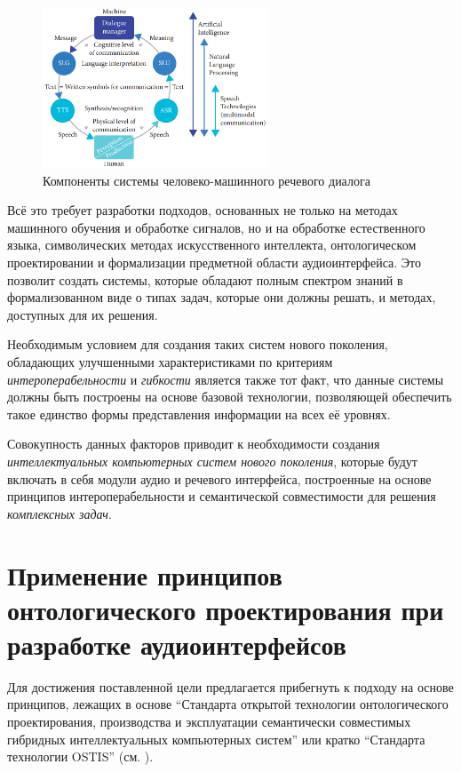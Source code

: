 \begin{figure}[H]
    \centerline{
        \includegraphics[scale=0.6, width=0.6\textwidth]{author/part4/figures/ch43_fig01_speech-hmi-components.png}
    }
    \caption{Компоненты системы человеко-машинного речевого диалога \cite{Delic2019speech}}
    \label{fig:speech-hmi-components}
\end{figure}

Всё это требует разработки подходов, основанных не только на методах машинного обучения и обработке сигналов, но и на обработке естественного языка, символических методах искусственного интеллекта, онтологическом проектировании и формализации предметной области аудиоинтерфейса. Это позволит создать системы, которые обладают полным спектром знаний в формализованном виде о типах задач, которые они должны решать, и методах, доступных для их решения.

Необходимым условием для создания таких систем нового поколения, обладающих улучшенными характеристиками по критериям \textit{интероперабельности} и \textit{гибкости} является также тот факт, что данные системы должны быть построены на основе базовой технологии, позволяющей обеспечить такое единство формы представления информации на всех её уровнях.
 
Совокупность данных факторов приводит к необходимости создания \textit{интеллектуальных компьютерных систем нового поколения}, которые будут включать в себя модули аудио и речевого интерфейса, построенные на основе принципов интероперабельности и семантической совместимости для решения \textit{комплексных задач}.


\section{Применение принципов онтологического проектирования при разработке аудиоинтерфейсов}
\label{sec_audio_interfaces_ostis_approach}

Для достижения поставленной цели предлагается прибегнуть к подходу на основе принципов, лежащих в основе ``Стандарта открытой технологии онтологического проектирования, производства и эксплуатации семантически совместимых гибридных интеллектуальных компьютерных систем'' или кратко ``Стандарта технологии OSTIS'' (см. ).

